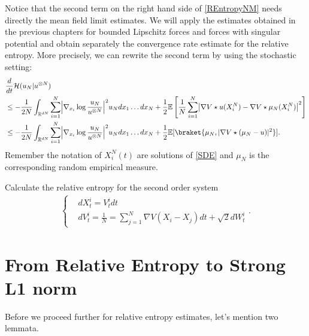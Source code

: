 Notice that the second term on the right hand side of \autoref{REntropyNM} needs directly the mean field limit estimates. We will apply the estimates obtained in the previous chapters for bounded Lipschitz forces and forces with singular potential and obtain separately the convergence rate estimate for the relative entropy.
More precisely, we can rewrite the second term by using the stochastic setting:
\begin{align}\label{ReE}
  &\frac{d}{dt} \mathcal{H}(u_{N} | u^{\otimes N}  ) \\
 \nonumber &\leq  -\frac{1}{2N} \int_{\mathbb{R}^{dN} } \sum_{i=1}^{N} \abs*{\nabla_{x_i} \log  \frac{u_N}{u^{\otimes N} }}^2 u_N  dx_{1}\ldots dx_N+ \frac{1}{2} \E\left[\frac{1}{N} \sum_{i=1}^{N} \abs*{\nabla V \star  u(X^N_i)-\nabla V \star  \mu_N(X^N_i)}^2 \right]\\
 \nonumber &\leq  -\frac{1}{2N} \int_{\mathbb{R}^{dN} } \sum_{i=1}^{N} \abs*{\nabla_{x_i} \log  \frac{u_N}{u^{\otimes N} }}^2 u_N  dx_{1}\ldots dx_N+ \frac{1}{2} \E[\braket{\mu_N , \abs{\nabla V \star (\mu_N - u)}^2}]
.\end{align}
Remember the notation of $X^N_i(t)$ are solutions of \eqref{SDE} and $\mu_N$ is the corresponding random empirical measure.

\begin{exercise}
	Calculate the relative entropy for the second order system 
	\begin{align*}
	\begin{cases}
	&dX_t^i = V_t^i dt\\
	&dV_t^i = \frac{1}{N} = \sum_{j=1}^{N} \nabla V(X_i-X_j)  dt + \sqrt{2}dW_t^i 
	\end{cases}
	.\end{align*}
\end{exercise}

\section{From Relative Entropy to Strong L1 norm}

Before we proceed further for relative entropy estimates, let's mention two lemmata.

